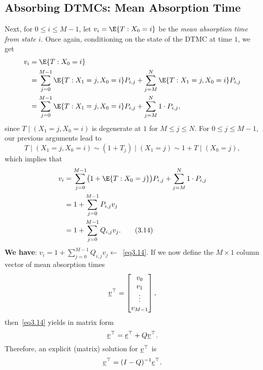 \subsection*{Absorbing DTMCs: Mean Absorption Time}
\begin{Regular}
    Next, for $ 0\le i\le M-1 $, let $ v_i=\E{T\given X_0=i} $ be the \emph{mean absorption time from state $i$}. Once again,
    conditioning on the state of the DTMC at time $1$, we get
    \begin{align*}
        v_{i}
         & =\E{T \given X_{0}=i}                                                                                          \\
         & =\sum_{j=0}^{M-1} \E{T \given X_{1}=j, X_{0}=i} P_{i, j}+\sum_{j=M}^{N} \E{T \given X_{1}=j, X_{0}=i} P_{i, j} \\
         & =\sum_{j=0}^{M-1} \E{T \given X_{1}=j, X_{0}=i} P_{i, j}+\sum_{j=M}^{N} 1 \cdot P_{i, j},
    \end{align*}
    since $ T\mid(X_1=j,X_0=i) $ is degenerate at $ 1 $ for $ M\le j\le N $. For $ 0\le j\le M-1 $, our previous arguments lead to
    \[ T\mid(X_1=j,X_0=i)\sim (1+T_j)\mid(X_1=j)\sim 1+T\mid(X_0=j), \]
    which implies that
    \begin{align*}
        v_{i}
         & =\sum_{j=0}^{M-1}\bigl(1+\E{T \given X_{0}=j}\bigr) P_{i, j}+\sum_{j=M}^{N} 1 \cdot P_{i, j} \\
         & =1+\sum_{j=0}^{M-1} P_{i, j} v_{j}                                                           \\
         & =1+\sum_{j=0}^{M-1} Q_{i, j} v_{j}.\label{eq3.14}\tag*{(3.14)}
    \end{align*}
    \textbf{We have}: $ v_i=1+\sum_{j=0}^{M-1} Q_{i,j}v_j\leftarrow $~\ref{eq3.14}. If we now define the $ M\times 1 $ column vector of mean absorption times
    \[ \underline{v}^\top=\begin{bmatrix}
            v_0    \\
            v_1    \\
            \vdots \\
            v_{M-1}
        \end{bmatrix}, \]
    then~\ref{eq3.14} yields in matrix form
    \[ \underline{v}^\top=\underline{e}^\top +Q \underline{v}^\top. \]
    Therefore, an explicit (matrix) solution for $ \underline{v}^\top $ is
    \[ \underline{v}^\top=(I-Q)^{-1}\underline{e}^\top. \]
\end{Regular}
